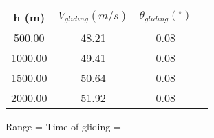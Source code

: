 \begin{tabular}{|cccc|} \hline 
h (m) & $V_{gliding} (m/s)$ & $\theta_{gliding} (^\circ)$ \\ \hline 
  500.00 &    48.21 &     0.08  \\ 
 1000.00 &    49.41 &     0.08  \\ 
 1500.00 &    50.64 &     0.08  \\ 
 2000.00 &    51.92 &     0.08  \\ \hline 
\end{tabular}
Range = Time of gliding = 